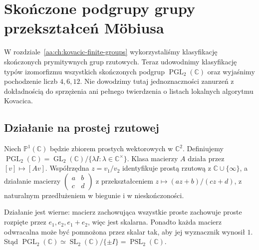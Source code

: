 \chapter{Skończone podgrupy grupy przekształceń Möbiusa}
\label{aa:ch:finite-pgl2}

W rozdziale~\ref{aa:ch:kovacic-finite-groups} wykorzystaliśmy
klasyfikację skończonych prymitywnych grup rzutowych. Teraz
udowodnimy klasyfikację typów izomorfizmu wszystkich skończonych
podgrup $\operatorname{PGL}_2(\mathbb C)$ oraz wyjaśnimy
pochodzenie liczb $4,6,12$. Nie dowodzimy tutaj jednoznaczności
zanurzeń z dokładnością do sprzężenia ani pełnego twierdzenia
o listach lokalnych algorytmu Kovacica.

\section{Działanie na prostej rzutowej}

\begin{definicja}
\label{aa:def:pgl2-projective}
Niech $\mathbb P^1(\mathbb C)$ będzie zbiorem prostych
wektorowych w $\mathbb C^2$. Definiujemy
$\operatorname{PGL}_2(\mathbb C)=
\operatorname{GL}_2(\mathbb C)/\{\lambda I:\lambda\in\mathbb C^\times\}$.
Klasa macierzy $A$ działa przez $[v]\mapsto[Av]$.
Współrzędna $z=v_1/v_2$ identyfikuje prostą rzutową
z $\mathbb C\cup\{\infty\}$, a działanie macierzy
$\left(\begin{smallmatrix}a&b\\c&d\end{smallmatrix}\right)$
z przekształceniem $z\mapsto(az+b)/(cz+d)$,
z naturalnym przedłużeniem w biegunie i w nieskończoności.
\end{definicja}

Działanie jest wierne: macierz zachowująca wszystkie proste
zachowuje proste rozpięte przez $e_1,e_2,e_1+e_2$,
więc jest skalarna. Ponadto każda macierz odwracalna
może być pomnożona przez skalar tak, aby jej wyznacznik
wynosił $1$. Stąd $\operatorname{PGL}_2(\mathbb C)
\simeq\operatorname{SL}_2(\mathbb C)/\{\pm I\}
=\operatorname{PSL}_2(\mathbb C)$.

